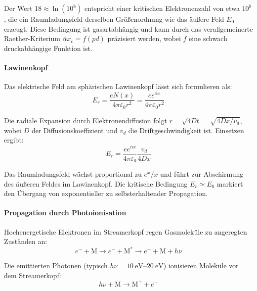 Der Wert $18 \approx \ln(10^8)$ entspricht einer kritischen Elektronenzahl von etwa $10^8$, die ein Raumladungsfeld derselben Größenordnung wie das äußere Feld $E_0$ erzeugt. Diese Bedingung ist gasartabhängig und kann durch das verallgemeinerte Raether-Kriterium $\overline{\alpha} x_c = f(pd)$ präzisiert werden, wobei $f$ eine schwach druckabhängige Funktion ist.


\paragraph{Lawinenkopf}
Das elektrische Feld am sphärischen Lawinenkopf lässt sich formulieren als:
\begin{equation}
    E_r = \frac{e N(x)}{4\pi \varepsilon_0 r^2} = \frac{e e^{\overline{\alpha}x}}{4\pi \varepsilon_0 r^2}
    \label{eq:electronlawfield}
\end{equation}

Die radiale Expansion durch Elektronendiffusion folgt $r = \sqrt{4Dt} = \sqrt{4Dx/v_d}$, wobei $D$ der Diffusionskoeffizient und $v_d$ die Driftgeschwindigkeit ist. Einsetzen ergibt:
\begin{equation}
    E_r = \frac{e e^{\overline{\alpha}x}}{4\pi \varepsilon_0} \frac{v_d}{4Dx}
    \label{eq:electronlawfielddif}
\end{equation}

Das Raumladungsfeld wächst proportional zu $e^x/x$ und führt zur Abschirmung des äußeren Feldes im Lawinenkopf. Die kritische Bedingung $E_r \simeq E_0$ markiert den Übergang von exponentieller zu selbsterhaltender Propagation.


\paragraph{Propagation durch Photoionisation}
Hochenergetische Elektronen im Streamerkopf regen Gasmoleküle zu angeregten Zuständen an:
\begin{equation}
    e^- + \text{M} \rightarrow e^- + \text{M}^* \rightarrow e^- + \text{M} + h\nu
\end{equation}

Die emittierten Photonen (typisch $h\nu = \SIrange{10}{20}{\electronvolt}$) ionisieren Moleküle vor dem Streamerkopf:
\begin{equation}
    h\nu + \text{M} \rightarrow \text{M}^+ + e^-
\end{equation}


